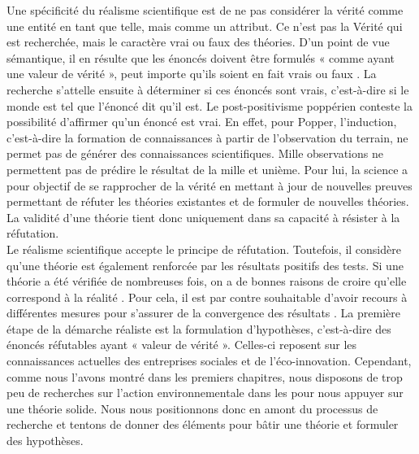     Une spécificité du réalisme scientifique est de ne pas considérer la vérité comme une entité en tant que telle, mais comme un attribut. Ce n’est pas la Vérité qui est recherchée, mais le caractère vrai ou faux des théories. D’un point de vue sémantique, il en résulte que les énoncés doivent être formulés « comme ayant une valeur de vérité », peut importe qu’ils soient en fait vrais ou faux \parencite{chakravartty2015scientific}. La recherche s’attelle ensuite à déterminer si ces énoncés sont vrais, c'est-à-dire si le monde est tel que l’énoncé dit qu’il est. Le post-positivisme poppérien conteste la possibilité d’affirmer qu’un énoncé est vrai. En effet, pour Popper, l’induction, c'est-à-dire la formation de connaissances à partir de l’observation du terrain, ne permet pas de générer des connaissances scientifiques. Mille observations ne permettent pas de prédire le résultat de la mille et unième. Pour lui, la science a pour objectif de se rapprocher de la vérité en mettant à jour de nouvelles preuves permettant de réfuter les théories existantes et de formuler de nouvelles théories. La validité d’une théorie tient donc uniquement dans sa capacité à résister à la réfutation. \\
    
    Le réalisme scientifique accepte le principe de réfutation. Toutefois, il considère qu’une théorie est également renforcée par les résultats positifs des tests. Si une théorie a été vérifiée de nombreuses fois, on a de bonnes raisons de croire qu’elle correspond à la réalité \parencite{hunt2011philosophical}. Pour cela, il est par contre souhaitable d’avoir recours à différentes mesures pour s’assurer de la convergence des résultats \parencite{chakravartty2015scientific}. La première étape de la démarche réaliste est la formulation d’hypothèses, c’est-à-dire des énoncés réfutables ayant « valeur de vérité ». Celles-ci reposent sur les connaissances actuelles des entreprises sociales et de l’éco-innovation. Cependant, comme nous l'avons montré dans les premiers chapitres, nous disposons de trop peu de recherches sur l'action environnementale dans les \eess pour nous appuyer sur une théorie solide. Nous nous positionnons donc en amont du processus de recherche et tentons de donner des éléments pour bâtir une théorie et formuler des hypothèses. \\
    
